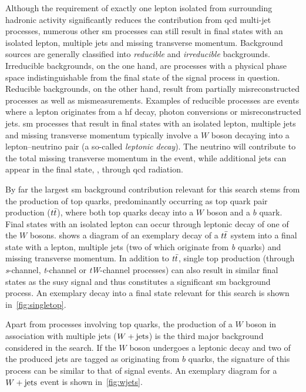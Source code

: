 Although the requirement of exactly one lepton isolated from surrounding hadronic activity significantly reduces the contribution from \gls{qcd} multi-jet processes, numerous other \gls{sm} processes can still result in final states with an isolated lepton, multiple jets and missing transverse momentum.
Background sources are generally classified into \textit{reducible} and \textit{irreducible} backgrounds. Irreducible backgrounds, on the one hand, are processes with a physical phase space indistinguishable from the final state of the signal process in question. Reducible backgrounds, on the other hand, result from partially misreconstructed processes as well as mismeasurements.
Examples of reducible processes are events where a lepton originates from a \gls{hf} decay, photon conversions or misreconstructed jets. \gls{sm} processes that result in final states with an isolated lepton, multiple jets and missing transverse momentum typically involve a $W$ boson decaying into a lepton--neutrino pair (a so-called \textit{leptonic decay}).
The neutrino will contribute to the total missing transverse momentum in the event, while additional jets can appear in the final state, \eg, through \gls{qcd} radiation.

By far the largest \gls{sm} background contribution relevant for this search stems from the production of top quarks, predominantly occurring as top quark pair production ($t\bar{t}$), where both top quarks decay into a $W$ boson and a $b$ quark. Final states with an isolated lepton can occur through leptonic decay of one of the $W$ bosons.
 shows a diagram of an exemplary decay of a $t\bar{t}$ system into a final state with a lepton, multiple jets (two of which originate from \textit{b} quarks) and missing transverse momentum.
In addition to $t\bar{t}$, single top production (through \textit{s}-channel, \textit{t}-channel or \textit{tW}-channel processes) can also result in similar final states as the \gls{susy} signal and thus constitutes a significant \gls{sm} background process.
An exemplary decay into a final state relevant for this search is shown in~\cref{fig:singletop}.

Apart from processes involving top quarks, the production of a $W$ boson in association with multiple jets ($W+\mathrm{jets}$) is the third major background considered in the \onelepton search.
If the $W$ boson undergoes a leptonic decay and two of the produced jets are tagged as originating from $b$ quarks, the signature of this process can be similar to that of signal events.
An exemplary diagram for a $W+\mathrm{jets}$ event is shown in~\cref{fig:wjets}.

